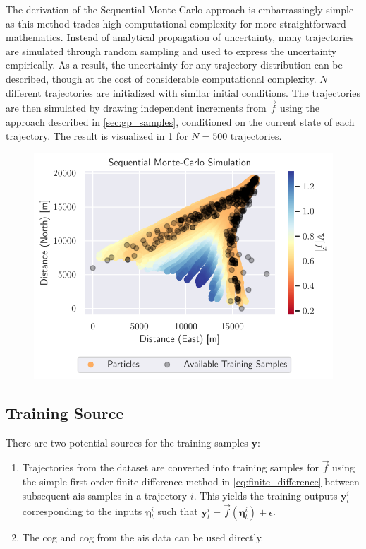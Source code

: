 The derivation of the Sequential Monte-Carlo approach is embarrassingly simple as this method trades high computational complexity for more straightforward mathematics. Instead of analytical propagation of uncertainty, many trajectories are simulated through random sampling and used to express the uncertainty empirically. As a result, the uncertainty for any trajectory distribution can be described, though at the cost of considerable computational complexity.
$N$ different trajectories are initialized with similar initial conditions. The trajectories are then simulated by drawing independent increments from $\vec{f}$ using the approach described in \cref{sec:gp_samples}, conditioned on the current state of each trajectory. The result is visualized in \cref{fig:gp_particle} for $N=500$ trajectories.
\begin{figure}[h]
    \centering
    \includegraphics[width=\textwidth]{figures/dyngp/gp_particle.pdf}
    \caption{}
    \label{fig:gp_particle}
\end{figure}

\subsection{Training Source}
There are two potential sources for the training samples $\boldsymbol{y}$:

\begin{enumerate}
    \item Trajectories from the dataset are converted into training samples for $\vec{f}$ using the simple first-order finite-difference method in \cref{eq:finite_difference} between subsequent \acrshort{ais} samples in a trajectory $i$. This yields the training outputs $\boldsymbol{y}_t^{i}$ corresponding to the inputs $\boldsymbol{\eta}_t^i$ such that $\boldsymbol{y}_t^i = \vec{f}(\boldsymbol{\eta}_t^i) + \epsilon$.
    \item The \acrshort{cog} and \acrshort{cog} from the \acrshort{ais} data can be used directly.
\end{enumerate}

